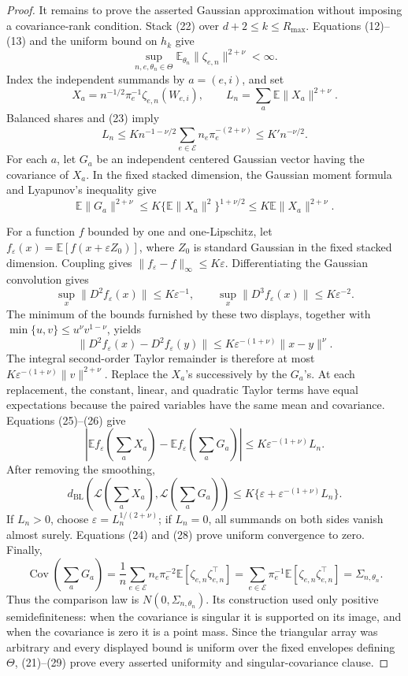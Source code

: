 \documentclass{article}
\begin{document}
\begin{proof}
It remains to prove the asserted Gaussian approximation without imposing a covariance-rank condition.  Stack (22) over \(d+2\leq k\leq R_{\max}\).  Equations (12)--(13) and the uniform bound on \(h_k\) give
\[
 \sup_{n,e,\theta_n\in\Theta}
 \mathbb E_{\theta_n}\|\zeta_{e,n}\|^{2+\nu}<\infty. \tag{23}
\]
Index the independent summands by \(a=(e,i)\), and set
\[
 X_a=n^{-1/2}\pi_e^{-1}\zeta_{e,n}(W_{e,i}),
 \qquad L_n=\sum_a\mathbb E\|X_a\|^{2+\nu}.
\]
Balanced shares and (23) imply
\[
 L_n
 \leq K n^{-1-\nu/2}
       \sum_{e\in\mathcal E}n_e\pi_e^{-(2+\nu)}
 \leq K'n^{-\nu/2}. \tag{24}
\]
For each \(a\), let \(G_a\) be an independent centered Gaussian vector having the covariance of \(X_a\).  In the fixed stacked dimension, the Gaussian moment formula and Lyapunov's inequality give
\[
 \mathbb E\|G_a\|^{2+\nu}
 \leq K\{\mathbb E\|X_a\|^2\}^{1+\nu/2}
 \leq K\mathbb E\|X_a\|^{2+\nu}. \tag{25}
\]

For a function \(f\) bounded by one and one-Lipschitz, let
\(f_\varepsilon(x)=\mathbb E[f(x+\varepsilon Z_0)]\), where \(Z_0\) is standard Gaussian in the fixed stacked dimension.  Coupling gives \(\|f_\varepsilon-f\|_\infty\leq K\varepsilon\).  Differentiating the Gaussian convolution gives
\[
 \sup_x\|D^2f_\varepsilon(x)\|\leq K\varepsilon^{-1},
 \qquad
 \sup_x\|D^3f_\varepsilon(x)\|\leq K\varepsilon^{-2}.
\]
The minimum of the bounds furnished by these two displays, together with
\(\min\{u,v\}\leq u^\nu v^{1-\nu}\), yields
\[
 \|D^2f_\varepsilon(x)-D^2f_\varepsilon(y)\|
 \leq K\varepsilon^{-(1+\nu)}\|x-y\|^\nu. \tag{26}
\]
The integral second-order Taylor remainder is therefore at most
\(K\varepsilon^{-(1+\nu)}\|v\|^{2+\nu}\).  Replace the \(X_a\)'s successively by the \(G_a\)'s.  At each replacement, the constant, linear, and quadratic Taylor terms have equal expectations because the paired variables have the same mean and covariance.  Equations (25)--(26) give
\[
 \left|\mathbb Ef_\varepsilon\!\left(\sum_aX_a\right)
       -\mathbb Ef_\varepsilon\!\left(\sum_aG_a\right)\right|
 \leq K\varepsilon^{-(1+\nu)}L_n. \tag{27}
\]
After removing the smoothing,
\[
 d_{\mathrm{BL}}\!\left(\mathcal L\!\left(\sum_aX_a\right),
                         \mathcal L\!\left(\sum_aG_a\right)\right)
 \leq K\{\varepsilon+\varepsilon^{-(1+\nu)}L_n\}. \tag{28}
\]
If \(L_n>0\), choose \(\varepsilon=L_n^{1/(2+\nu)}\); if \(L_n=0\), all summands on both sides vanish almost surely.  Equations (24) and (28) prove uniform convergence to zero.  Finally,
\[
 \operatorname{Cov}\!\left(\sum_aG_a\right)
 =\frac1n\sum_{e\in\mathcal E}n_e\pi_e^{-2}
   \mathbb E[\zeta_{e,n}\zeta_{e,n}^\top]
 =\sum_{e\in\mathcal E}\pi_e^{-1}
   \mathbb E[\zeta_{e,n}\zeta_{e,n}^\top]
 =\Sigma_{n,\theta_n}. \tag{29}
\]
Thus the comparison law is \(N(0,\Sigma_{n,\theta_n})\).  Its construction used only positive semidefiniteness: when the covariance is singular it is supported on its image, and when the covariance is zero it is a point mass.  Since the triangular array was arbitrary and every displayed bound is uniform over the fixed envelopes defining \(\Theta\), (21)--(29) prove every asserted uniformity and singular-covariance clause.
\end{proof}
\end{document}
